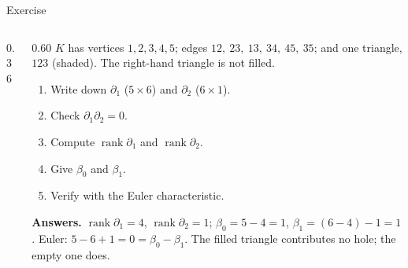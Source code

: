 \documentclass[10pt,aspectratio=169]{beamer}
\newcommand{\rank}{\operatorname{rank}}
\begin{document}
    \begin{frame}{Exercise}
        \begin{columns}[T,onlytextwidth]
            \begin{column}{0.36\textwidth}
                \centering
            \end{column}
            \begin{column}{0.60\textwidth}
                \small
                $K$ has vertices $1,2,3,4,5$; edges
                $12,\ 23,\ 13,\ 34,\ 45,\ 35$; and \alert{one} triangle, $123$
                (shaded). The right-hand triangle is \alert{not} filled.

                \vspace{0.6em}
                \begin{enumerate}
                    \item Write down $\partial_1$ ($5\times6$) and $\partial_2$ ($6\times1$).
                    \item Check $\partial_1\partial_2=0$.
                    \item Compute $\rank\partial_1$ and $\rank\partial_2$.
                    \item Give $\beta_0$ and $\beta_1$.
                    \item Verify with the Euler characteristic.
                \end{enumerate}

                \vspace{0.5em}

                \footnotesize
                \textbf{Answers.} $\rank\partial_1=4$, $\rank\partial_2=1$;
                $\beta_0=5-4=1$, $\beta_1=(6-4)-1=1$.
                Euler: $5-6+1=0=\beta_0-\beta_1$. \checkmark
                The filled triangle contributes no hole; the empty one does.
            \end{column}
        \end{columns}
    \end{frame}
\end{document}

